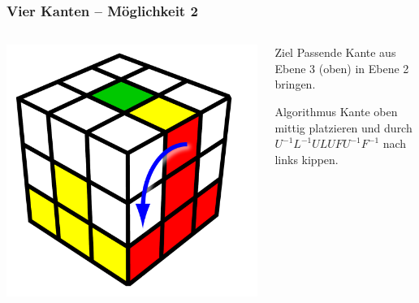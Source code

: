 \begin{frame}
	\frametitle{Vier Kanten -- Möglichkeit 2}
	
	\begin{columns}[c]
		\begin{column}[C]{.5\textwidth}
			\center
			\includegraphics[scale=0.3]{img/layer2edge2}			
		\end{column}
		\begin{column}[C]{.5\textwidth}
			\begin{block}{Ziel}
				Passende Kante aus Ebene 3 (oben) in Ebene 2 bringen.
			\end{block}
			\begin{exampleblock}{Algorithmus}
				Kante oben mittig platzieren und durch $U^{-1}L^{-1}ULUFU^{-1}F^{-1}$ nach links kippen.
			\end{exampleblock}
		\end{column}
	\end{columns}
	
\end{frame}

